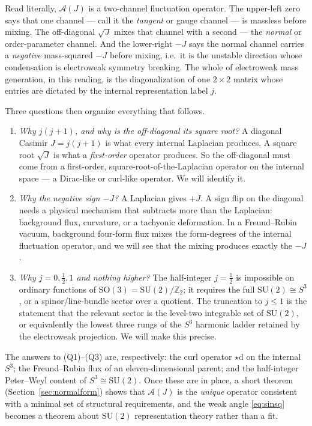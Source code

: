 \documentclass[11pt]{article}
\theoremstyle{plain}
\theoremstyle{definition}
\newcommand{\cA}{\mathcal{A}}
\newcommand{\half}{\tfrac12}
\newcommand{\dd}{\mathrm{d}}
\newcommand{\Z}{\mathbb{Z}}
\newcommand{\SU}{\mathrm{SU}}
\newcommand{\SO}{\mathrm{SO}}
\begin{document}
Read literally, $\cA(J)$ is a two-channel fluctuation operator. The
upper-left zero says that one channel --- call it the \emph{tangent} or
gauge channel --- is massless before mixing. The off-diagonal $\sqrt J$
mixes that channel with a second --- the \emph{normal} or order-parameter
channel. And the lower-right $-J$ says the normal channel carries a
\emph{negative} mass-squared $-J$ before mixing, i.e.\ it is the unstable
direction whose condensation is electroweak symmetry breaking. The whole of
electroweak mass generation, in this reading, is the diagonalization of one
$2\times2$ matrix whose entries are dictated by the internal
representation label $j$.

Three questions then organize everything that follows.
\begin{enumerate}
\item[(Q1)] \emph{Why $j(j+1)$, and why is the off-diagonal its square
root?} A diagonal Casimir $J=j(j+1)$ is what every internal Laplacian
produces. A square root $\sqrt J$ is what a \emph{first-order} operator
produces. So the off-diagonal must come from a first-order, square-root-of-the-Laplacian
operator on the internal space --- a Dirac-like or curl-like operator. We
will identify it.
\item[(Q2)] \emph{Why the negative sign $-J$?} A Laplacian gives $+J$. A
sign flip on the diagonal needs a physical mechanism that subtracts more
than the Laplacian: background flux, curvature, or a tachyonic deformation.
In a Freund--Rubin vacuum, background four-form flux mixes the
form-degrees of the internal fluctuation operator, and we will see that the
mixing produces exactly the $-J$.
\item[(Q3)] \emph{Why $j=0,\half,1$ and nothing higher?} The half-integer
$j=\half$ is impossible on ordinary functions of $\SO(3)=\SU(2)/\Z_2$; it
requires the full $\SU(2)\cong S^3$, or a spinor/line-bundle sector over a
quotient. The truncation to $j\le1$ is the statement that the relevant
sector is the level-two integrable set of $\SU(2)$, or equivalently the
lowest three rungs of the $S^3$ harmonic ladder retained by the
electroweak projection. We will make this precise.
\end{enumerate}

The answers to (Q1)--(Q3) are, respectively: the curl operator $\star\dd$
on the internal $S^3$; the Freund--Rubin flux of an eleven-dimensional
parent; and the half-integer Peter--Weyl content of $S^3\cong\SU(2)$. Once
these are in place, a short theorem (Section~\ref{sec:normalform}) shows
that $\cA(J)$ is the \emph{unique} operator consistent with a minimal set
of structural requirements, and the weak angle \eqref{eq:sinsq} becomes a
theorem about $\SU(2)$ representation theory rather than a fit.
\end{document}
